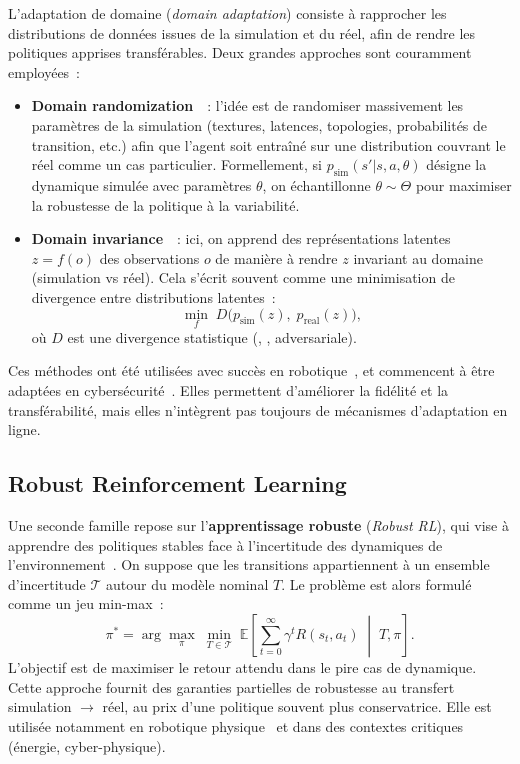 \noindent
L’adaptation de domaine (\textit{domain adaptation}) consiste à rapprocher
les distributions de données issues de la simulation et du réel,
afin de rendre les politiques apprises transférables.
Deux grandes approches sont couramment employées~:

\begin{itemize}
  \item \textbf{Domain randomization}~\cite{tobin2017domain}~: l’idée est de
        randomiser massivement les paramètres de la simulation (textures, latences, topologies,
        probabilités de transition, etc.) afin que l’agent soit entraîné sur une distribution
        couvrant le réel comme un cas particulier. Formellement, si
        $p_\text{sim}(s'|s,a,\theta)$ désigne la dynamique simulée
        avec paramètres $\theta$, on échantillonne $\theta \sim \Theta$ pour
        maximiser la robustesse de la politique à la variabilité.
  \item \textbf{Domain invariance}~\cite{ganin2016domain}~: ici, on apprend
        des représentations latentes $z = f(o)$ des observations $o$
        de manière à rendre $z$ invariant au domaine
        (simulation vs réel). Cela s’écrit souvent comme une minimisation
        de divergence entre distributions latentes~:
        \[
          \min_f \; D\big(p_\text{sim}(z), \; p_\text{real}(z)\big),
        \]
        où $D$ est une divergence statistique (, , adversariale).
\end{itemize}

\noindent
Ces méthodes ont été utilisées avec succès en robotique~\cite{tobin2017domain, peng2018sim},
et commencent à être adaptées en cybersécurité~\cite{Standen2021}.
Elles permettent d’améliorer la fidélité et la transférabilité,
mais elles n’intègrent pas toujours de mécanismes d’adaptation en ligne.

\subsection{Robust Reinforcement Learning}

\noindent
Une seconde famille repose sur l’\textbf{apprentissage robuste}
(\textit{Robust RL}), qui vise à apprendre des politiques stables
face à l’incertitude des dynamiques de l’environnement~\cite{pinto2017robust}.
On suppose que les transitions appartiennent à un ensemble d’incertitude
$\mathcal{T}$ autour du modèle nominal $T$.
Le problème est alors formulé comme un jeu min-max~:
\[
  \pi^* = \arg\max_\pi \; \min_{T \in \mathcal{T}}
  \; \mathbb{E}\!\left[\sum_{t=0}^\infty \gamma^t R(s_t,a_t) \;\middle|\; T, \pi\right].
\]
L’objectif est de maximiser le retour attendu
dans le pire cas de dynamique.
Cette approche fournit des garanties partielles de robustesse
au transfert simulation $\rightarrow$ réel,
au prix d’une politique souvent plus conservatrice.
Elle est utilisée notamment en robotique physique~\cite{pinto2017robust}
et dans des contextes critiques (énergie, cyber-physique).

